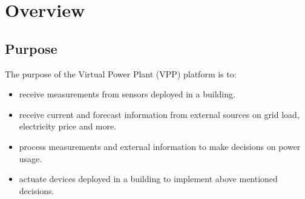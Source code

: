 \chapter{Overview}

\section{Purpose}

The purpose of the Virtual Power Plant (VPP) platform is to:
\begin{itemize}
	\item receive measurements from sensors deployed in a building.
	\item receive current and forecast information from external sources on grid load, electricity price and more.
	\item process measurements and external information to make decisions on power usage.
	\item actuate devices deployed in a building to implement above mentioned decisions.
\end{itemize} 


